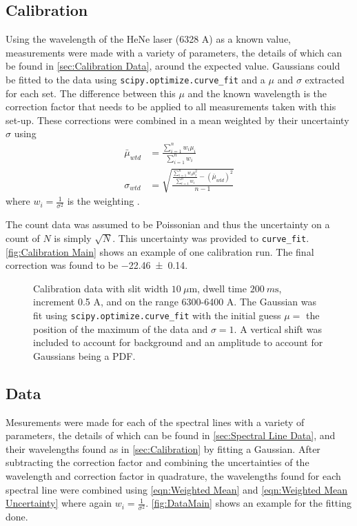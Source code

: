 \documentclass[11pt]{article}
\numberwithin{equation}{section}
\numberwithin{figure}{section}
\numberwithin{table}{section}
\begin{document}
\subsection{Calibration}\label{sec:Calibration}
\par Using the wavelength of the HeNe laser (6328 A) as a known value, measurements were made with a variety of parameters, the details of which can be found in \autoref{sec:Calibration Data}, around the expected value. Gaussians could be fitted to the data using \texttt{scipy.optimize.curve\_fit} and a $\mu$ and $\sigma$ extracted for each set. The difference between this $\mu$ and the known wavelength is the correction factor that needs to be applied to all measurements taken with this set-up. These corrections were combined in a mean weighted by their uncertainty $\sigma$ using
\begin{align}
    \bar \mu_{wtd}&=\frac{\sum\limits_{i=1}^nw_i\mu_i}{\sum\limits_{i=1}^nw_i}\label{eqn:Weighted Mean}\\
    \sigma_{wtd}&=\sqrt{\frac{\frac{\sum\limits_{i=1}^nw_i\mu_i^2}{\sum\limits_{i=1}^nw_i}-(\bar\mu_{wtd})^2}{n-1}}\label{eqn:Weighted Mean Uncertainty}
\end{align}
where $w_i=\frac{1}{\sigma^2}$ is the weighting \cite{Data Reduction}. 
\par The count data was assumed to be Poissonian and thus the uncertainty on a count of $N$ is simply $\sqrt{N}$. This uncertainty was provided to \texttt{curve\_fit}. \autoref{fig:Calibration Main} shows an example of one calibration run. The final correction was found to be \num{-22.46\pm0.14}.

\begin{figure}[h]
    \begin{center}
       \caption{Calibration data with slit width $\SI{10}{\mu\m}$, dwell time $\SI{200}{m\second}$, increment 0.5 A, and on the range 6300-6400 A. The Gaussian was fit using \texttt{scipy.optimize.curve\_fit} with the initial guess $\mu=$ the position of the maximum of the data and $\sigma=1$. A vertical shift was included to account for background and an amplitude to account for Gaussians being a PDF.}
       \label{fig:Calibration Main}
    \end{center}
\end{figure}

\subsection{Data}\label{sec:Data}
\par Mesurements were made for each of the spectral lines with a variety of parameters, the details of which can be found in \autoref{sec:Spectral Line Data}, and their wavelengths found as in \autoref{sec:Calibration} by fitting a Gaussian. After subtracting the correction factor and combining the uncertainties of the wavelength and correction factor in quadrature, the wavelengths found for each spectral line were combined using \autoref{eqn:Weighted Mean} and \autoref{eqn:Weighted Mean Uncertainty} where again $w_i=\frac{1}{\sigma^2}$. \autoref{fig:DataMain} shows an example for the fitting done.
\end{document}
